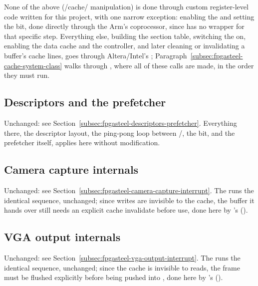 None of the above (/cache/ manipulation) is done through custom register-level code written for this project, with one narrow exception: enabling the  and setting the  bit, done directly through the Arm's  coprocessor, since  has no wrapper for that specific step. Everything else, building the section table, switching the  on, enabling the  data cache and the  controller, and later cleaning or invalidating a buffer's cache lines, goes through Altera/Intel's ; Paragraph~\ref{subsec:fpgasteel-cache-system-class} walks through , where all of these calls are made, in the order they must run.

\subsection{Descriptors and the prefetcher}
\label{subsec:fpgasteel-cache-descriptors-prefetcher}

Unchanged: see Section~\ref{subsec:fpgasteel-descriptors-prefetcher}. Everything there, the descriptor layout, the ping-pong loop between /, the  bit, and the prefetcher itself, applies here without modification.

\subsection{Camera capture internals}
\label{subsec:fpgasteel-cache-camera-capture}

Unchanged: see Section~\ref{subsec:fpgasteel-camera-capture-interrupt}. The   runs the identical sequence, unchanged; since  writes are invisible to the  cache, the buffer it hands over still needs an explicit cache invalidate before use, done here by 's  ().

\subsection{VGA output internals}
\label{subsec:fpgasteel-cache-vga-output}

Unchanged: see Section~\ref{subsec:fpgasteel-vga-output-interrupt}. The   runs the identical sequence, unchanged; since the  cache is invisible to  reads, the frame must be flushed explicitly before being pushed into , done here by 's  ().

